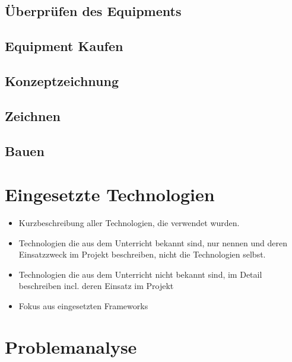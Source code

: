 \section{Überprüfen des Equipments}

\section{Equipment Kaufen}
\section{Konzeptzeichnung}
\section{Zeichnen}
\section{Bauen}


\chapter{Eingesetzte Technologien} \label{sec:tech}
\begin{itemize}
	\item Kurzbeschreibung aller Technologien, die verwendet wurden.
	\item Technologien die aus dem Unterricht bekannt sind, nur nennen und deren  Einsatzzweck im Projekt beschreiben, nicht die Technologien selbst.
	\item Technologien die aus dem Unterricht nicht bekannt sind, im Detail beschreiben incl. deren Einsatz im Projekt
	\item Fokus aus eingesetzten Frameworks
\end{itemize}



\chapter{Problemanalyse}
